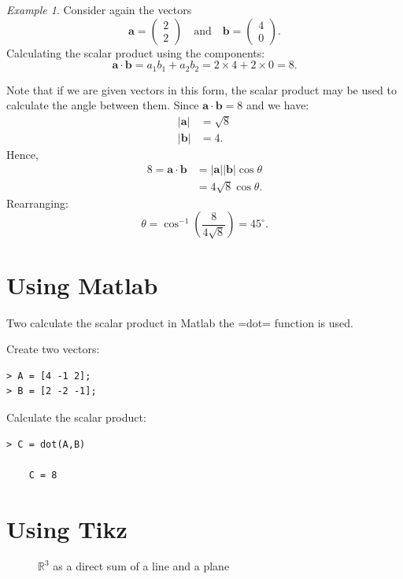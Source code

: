 \documentclass[12pt,a4paper]{article}
\theoremstyle{definition}
\theoremstyle{remark}
\newtheorem{example}[proposition]{Example}
\newcommand{\bvec}[1]{\mathrm{\mathbf{#1}}}
\newcommand{\cvec}[2]{\begin{pmatrix} #1 \\ #2 \end{pmatrix}}
\newcommand{\vmod}[1]{{\lvert {#1} \rvert}}
\newcommand{\R}{\mathbb{R}}
\begin{document}
\begin{example}
Consider again the vectors
\[
\bvec{a} = \cvec{2}{2} \quad \text{and} \quad \bvec{b} = \cvec{4}{0}.
\]
Calculating the scalar product using the components:
\[
\bvec{a} \cdot \bvec{b} = a_1b_1 + a_2b_2 = 2\times 4 + 2\times 0 = 8. 
\]

Note that if we are given vectors in this form, the scalar product may be used to calculate the angle between them. Since \(\bvec{a} \cdot \bvec{b} = 8\) and we have:
\begin{align*}
\vmod{\bvec{a}} &= \sqrt{8}\\
\vmod{\bvec{b}} &= 4.
\end{align*}
Hence,
\begin{align*}
8 = \bvec{a} \cdot \bvec{b} &= \vmod{\bvec{a}}\vmod{\bvec{b}}\cos\theta\\
\,&= 4\sqrt{8}\cos \theta.
\end{align*}
Rearranging:
\[
\theta = \cos^{-1}\left(\frac{8}{4\sqrt{8}}\right) = {45}^{\circ}.
\]
\end{example}

\section{Using Matlab}

Two calculate the scalar product in Matlab the \spverb=dot= function is used. 

Create two vectors:
\begin{lstlisting}
> A = [4 -1 2];
> B = [2 -2 -1];
\end{lstlisting}

Calculate the scalar product:
\begin{lstlisting}
> C = dot(A,B)
    
    C = 8
\end{lstlisting}

\section{Using Tikz}

\begin{figure}[ht]
  \centering
  \caption{$\R^3$ as a direct sum of a line and a plane}
  \label{fig:dsum}
\end{figure}
\end{document}
